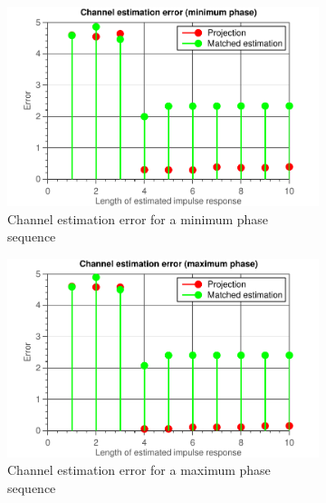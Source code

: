\documentclass[11pt,titlepage]{report}
\begin{document}
\begin{figure}[H]
	\centering
	\begin{subfigure}{0.49\textwidth}
		\includegraphics[width=\textwidth]{../../deliverable-7-resources/figures/ass-1/report-8-9-10/report-9-noise-0.1/ass-1-report-9-minimum-phase.pdf}
		\caption{\centering Channel estimation error for a minimum phase sequence}
	\end{subfigure}
	\begin{subfigure}{0.49\textwidth}
		\includegraphics[width=\textwidth]{../../deliverable-7-resources/figures/ass-1/report-8-9-10/report-9-noise-0.1/ass-1-report-9-maximum-phase.pdf}
		\caption{\centering Channel estimation error for a maximum phase sequence}
	\end{subfigure}
	\begin{subfigure}{0.49\textwidth}

\end{subfigure}
\end{figure}
\end{document}
